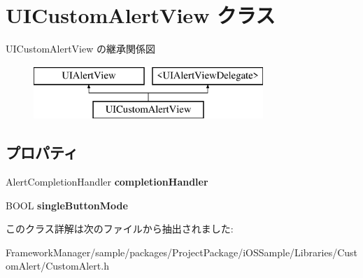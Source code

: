 \hypertarget{interface_u_i_custom_alert_view}{}\section{U\+I\+Custom\+Alert\+View クラス}
\label{interface_u_i_custom_alert_view}
U\+I\+Custom\+Alert\+View の継承関係図\begin{figure}[H]
\begin{center}
\leavevmode
\includegraphics[height=2.000000cm]{interface_u_i_custom_alert_view}
\end{center}
\end{figure}
\subsection*{プロパティ}
\begin{DoxyCompactItemize}
\item 
\hypertarget{interface_u_i_custom_alert_view_a325714aceb9a4194c401bb9cca971a49}{}Alert\+Completion\+Handler {\bfseries completion\+Handler}\label{interface_u_i_custom_alert_view_a325714aceb9a4194c401bb9cca971a49}

\item 
\hypertarget{interface_u_i_custom_alert_view_a92463117131cad40de3c1e54bf7ffb98}{}B\+O\+O\+L {\bfseries single\+Button\+Mode}\label{interface_u_i_custom_alert_view_a92463117131cad40de3c1e54bf7ffb98}

\end{DoxyCompactItemize}


このクラス詳解は次のファイルから抽出されました\+:\begin{DoxyCompactItemize}
\item 
Framework\+Manager/sample/packages/\+Project\+Package/i\+O\+S\+Sample/\+Libraries/\+Custom\+Alert/Custom\+Alert.\+h\end{DoxyCompactItemize}
